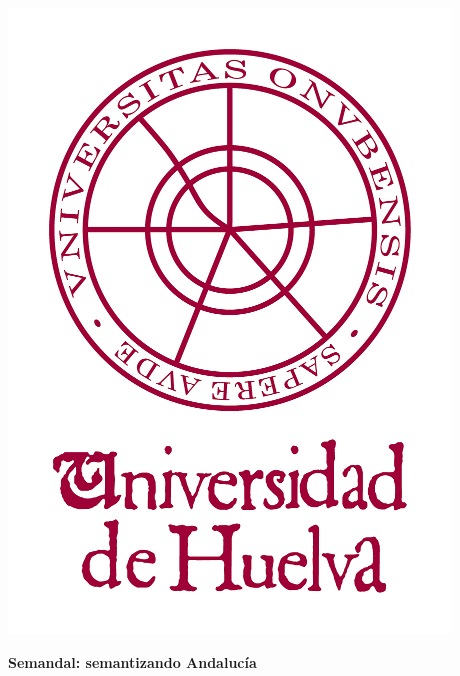 \thispagestyle{empty}
\begin{center}
\includegraphics[scale=0.4]{./00_Titulo/figs/logoUHU}
\end{center}
\vspace*{0cm}
\Large 
%

\vspace{2cm}

\LARGE

\begin{center}
{\bf  Semandal: semantizando Andalucía}
\end{center} 

\Large






